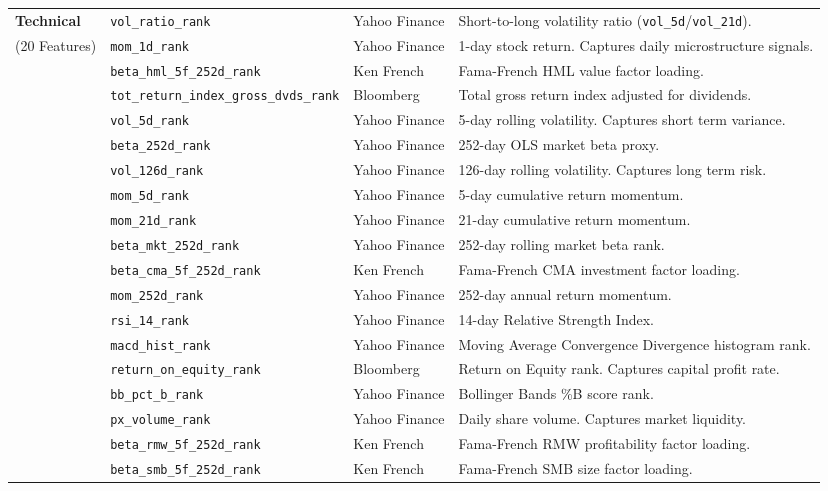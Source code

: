 \documentclass[11pt]{article}
\begin{document}
\begin{longtable}{p{3.0cm} p{4.5cm} p{2.2cm} p{6.0cm}}
    \bottomrule
    \endlastfoot
    \textbf{Technical} & \texttt{vol\_ratio\_rank} & Yahoo Finance & Short-to-long volatility ratio (\texttt{vol\_5d}/\texttt{vol\_21d}). \\
    (20 Features) & \texttt{mom\_1d\_rank} & Yahoo Finance & 1-day stock return. Captures daily microstructure signals. \\
    & \texttt{beta\_hml\_5f\_252d\_rank} & Ken French & Fama-French HML value factor loading. \\
    & \texttt{tot\_return\_index\_gross\_dvds\_rank} & Bloomberg & Total gross return index adjusted for dividends. \\
    & \texttt{vol\_5d\_rank} & Yahoo Finance & 5-day rolling volatility. Captures short term variance. \\
    & \texttt{beta\_252d\_rank} & Yahoo Finance & 252-day OLS market beta proxy. \\
    & \texttt{vol\_126d\_rank} & Yahoo Finance & 126-day rolling volatility. Captures long term risk. \\
    & \texttt{mom\_5d\_rank} & Yahoo Finance & 5-day cumulative return momentum. \\
    & \texttt{mom\_21d\_rank} & Yahoo Finance & 21-day cumulative return momentum. \\
    & \texttt{beta\_mkt\_252d\_rank} & Yahoo Finance & 252-day rolling market beta rank. \\
    & \texttt{beta\_cma\_5f\_252d\_rank} & Ken French & Fama-French CMA investment factor loading. \\
    & \texttt{mom\_252d\_rank} & Yahoo Finance & 252-day annual return momentum. \\
    & \texttt{rsi\_14\_rank} & Yahoo Finance & 14-day Relative Strength Index. \\
    & \texttt{macd\_hist\_rank} & Yahoo Finance & Moving Average Convergence Divergence histogram rank. \\
    & \texttt{return\_on\_equity\_rank} & Bloomberg & Return on Equity rank. Captures capital profit rate. \\
    & \texttt{bb\_pct\_b\_rank} & Yahoo Finance & Bollinger Bands \%B score rank. \\
    & \texttt{px\_volume\_rank} & Yahoo Finance & Daily share volume. Captures market liquidity. \\
    & \texttt{beta\_rmw\_5f\_252d\_rank} & Ken French & Fama-French RMW profitability factor loading. \\
    & \texttt{beta\_smb\_5f\_252d\_rank} & Ken French & Fama-French SMB size factor loading. \\

\end{longtable}
\end{document}
